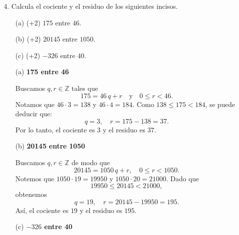 \documentclass[12pt]{article}
\begin{document}
\begin{enumerate}
\begin{enumerate}
    \item[(c)] \textbf{Probar que si $a \leq b$ y $c < d$, entonces $a - d < b - c$.}
    
    \noindent
    \textit{Demostraci\'on:}   CTM HECTOR
    Dados $a \leq b$ y $c < d$, queremos ver que $a - d < b - c$. Podemos reescribir:
    \[
    (a - d) - (b - c) \;=\; a - d - b + c \;=\; (a - b) + (c - d).
    \]
    Como $a \leq b$, se tiene $a - b \leq 0$; adem\'as, de $c < d$ se sigue $c - d < 0$. Por lo tanto,
    \[
    (a - b) + (c - d) \;<\; 0 + 0 \;=\; 0,
    \]
    lo cual implica 
    \[
    (a - d) - (b - c) \;<\; 0 
    \;\;\Longrightarrow\;\;
    a - d \;<\; b - c.
    \]
    As\'i se demuestra la desigualdad requerida.
    \end{enumerate}

    
    \item[4.] Calcula el cociente y el residuo de los siguientes incisos.
      \begin{enumerate}
        \item[(a) (+2)] $175$ entre $46$.
        \item[(b) (+2)] $20145$ entre $1050$.
        \item[(c) (+2)] $-326$ entre $40$.
      \end{enumerate}
    
      \begin{enumerate}
    \item[(a)] \textbf{175 entre 46}
    
    Buscamos $q,r \in \mathbb{Z}$ tales que
    \[
    175 = 46\,q + r
    \quad\text{y}\quad
    0 \leq r < 46.
    \]
    Notamos que $46 \cdot 3 = 138$ y $46 \cdot 4 = 184$. Como $138 \le 175 < 184$, se puede deducir que:
    \[
    q = 3,
    \quad
    r = 175 - 138 = 37.
    \]
    Por lo tanto, el cociente es $3$ y el residuo es $37$.
    
    \item[(b)] \textbf{20145 entre 1050}
    
    Buscamos $q,r \in \mathbb{Z}$ de modo que
    \[
    20145 = 1050\,q + r,
    \quad
    0 \leq r < 1050.
    \]
    Notemos que $1050 \cdot 19 = 19950$ y $1050 \cdot 20 = 21000$. Dado que
    \[
    19950 \le 20145 < 21000,
    \]
    obtenemos
    \[
    q = 19,
    \quad
    r = 20145 - 19950 = 195.
    \]
    As\'i, el cociente es $19$ y el residuo es $195$.
    
    \item[(c)] \textbf{$-326$ entre 40}
    

\end{enumerate}
\end{enumerate}
\end{document}
